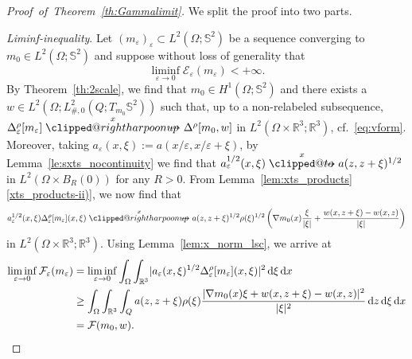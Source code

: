 \documentclass[reqno,11pt]{amsart}
\makeatletter
\numberwithin{equation}{section}
\theoremstyle{thmlemcorr}
\numberwithin{theorem}{section}
\theoremstyle{thmlemcorr*}
\theoremstyle{defi}
\theoremstyle{remexample}
\theoremstyle{ass}
\newcommand{\R}{\mathbb{R}}
\renewcommand{\S}{\mathbb{S}}
\newcommand{\Ecal}{\mathcal{E}}
\newcommand{\Fcal}{\mathcal{F}}
\renewcommand{\epsilon}{\varepsilon}
\newcommand{\dd}{\,\mathrm{d}}
\DeclarePairedDelimiter{\abs}{\lvert}{\rvert}
\newcommand{\1}{\mathds{1}}
\DeclareRobustCommand{\wtwoscale}{%
  \clippedrightharpoonup\mathrel{\mspace{-15mu}}\rightharpoonup
}
\newcommand{\clippedrightharpoonup}{%
  \mathrel{\mathpalette\clipped@rightharpoonup\relax}%
}
\newcommand{\clipped@rightharpoonup}[2]{%
  \sbox\z@{$\m@th#1\mspace{6mu}$}%
  \clipbox{0pt 0pt {\dimexpr\width-.5\wd\z@} 0pt}{$\m@th#1\rightharpoonup$}%
  \smash{\clipbox{{\wd\z@} 0pt 0pt {-\width}}{$\m@th#1\rightharpoonup$}}%
}
\DeclareRobustCommand{\twoscale}{%
  \clippedto\mathrel{\mspace{-15mu}}\to
}
\newcommand{\clippedto}{%
  \mathrel{\mathpalette\clipped@to\relax}%
}
\newcommand{\clipped@to}[2]{%
  \sbox\z@{$\m@th#1\mspace{6mu}$}%
  \clipbox{0pt 0pt {\dimexpr\width-.5\wd\z@} 0pt}{$\m@th#1\to$}%
  \smash{\clipbox{{\wd\z@} 0pt 0pt {-\width}}{$\m@th#1\to$}}%
}
\newcommand{\xtwoscale}{\overset{x}{\twoscale}}
\newcommand{\wxtwoscale}{\overset{x}{\wtwoscale}}
\makeatother
\begin{document}
\begin{proof}[Proof~of~Theorem~\ref{th:Gammalimit}]
We split the proof into two parts. \smallskip

\textit{Liminf-inequality}. Let $(m_\epsilon)_\epsilon \subset L^2(\Omega;\S^2)$ be a sequence converging to $m_0 \in L^2(\Omega;\S^2)$ and suppose without loss of generality that
\[
\liminf_{\epsilon \to 0} \Ecal_\epsilon(m_\epsilon) < +\infty.
\]
By Theorem~\ref{th:2scale}, we find that $m_0 \in H^1(\Omega;\S^2)$ and there exists a $w \in L^2(\Omega;L^2_{\#,0}(Q;T_{m_0}\S^2))$ such that, up to a non-relabeled subsequence, $\Delta^\rho_\epsilon [m_\epsilon] \wxtwoscale \Delta^\rho[m_0,w]$ in $L^2(\Omega\times\R^3;\R^3)$, cf.~\eqref{eq:vform}. Moreover, taking $a_\epsilon(x,\xi):=a(x/\epsilon,x/\epsilon+\xi)$, by Lemma~\ref{le:sxts_nocontinuity} we find that $a_\epsilon^{1/2}(x,\xi) \xtwoscale a(z,z+\xi)^{1/2}$ in $L^2(\Omega\times B_R(0))$ for any $R>0$. 
From Lemma~\ref{lem:xts_products}\,\ref{xts_products-ii)}, we now find that 
\[
a_\epsilon^{1/2}(x,\xi)\Delta^\rho_\epsilon [m_\epsilon](x,\xi) \wxtwoscale a(z,z+\xi)^{1/2}\rho(\xi)^{1/2}\left(\nabla m_0(x)\frac{\xi}{|\xi|}+\frac{w(x,z+\xi)-w(x,z)}{|\xi|}\right)
\]
in $L^2(\Omega\times\R^3;\R^3)$. Using Lemma~\ref{lem:x_norm_lsc}, we arrive at
\begin{align}
\begin{split}\label{eq:Fliminf}
\liminf_{\epsilon \to 0} \Fcal_\epsilon(m_\epsilon) &= \liminf_{\epsilon \to 0} \int_{\Omega}\int_{\R^3} \abs{a_\epsilon(x,\xi)^{1/2}\Delta^\rho_\epsilon [m_\epsilon](x,\xi)}^2\dd \xi\dd x \\
&\geq \int_{\Omega}\int_{\R^3}\int_{Q} a(z,z+\xi)\rho(\xi)\frac{\abs{\nabla m_0(x)\xi+w(x,z+\xi)-w(x,z)}^2}{|\xi|^2} \dd z \dd \xi \dd x\\
&= \Fcal(m_0,w).
\end{split}
\end{align}


\end{proof}
\end{document}
